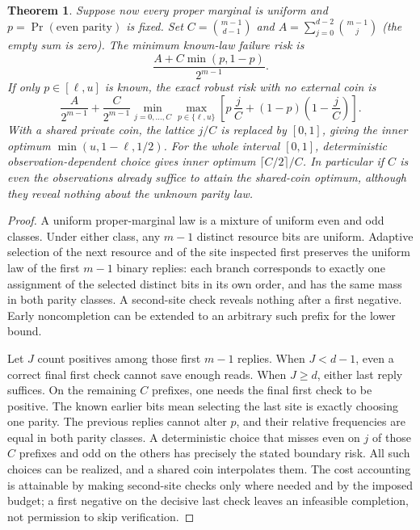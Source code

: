 \documentclass[11pt]{article}
\newtheorem{theorem}{Theorem}
\begin{document}
\begin{theorem}
Suppose now every proper marginal is uniform and $p=\Pr(\text{even parity})$ is fixed. Set $C=\binom{m-1}{d-1}$ and $A=\sum_{j=0}^{d-2}\binom{m-1}{j}$ (the empty sum is zero). The minimum known-law failure risk is
\[
 \frac{A+C\min(p,1-p)}{2^{m-1}} .
\]
If only $p\in[\ell,u]$ is known, the exact robust risk with no external coin is
\[
 \frac{A}{2^{m-1}}+
 \frac{C}{2^{m-1}}
 \min_{j=0,\ldots,C}\max_{p\in\{\ell,u\}}
 \left[p\,\frac{j}{C}+(1-p)(1-\frac{j}{C})\right].
\]
With a shared private coin, the lattice $j/C$ is replaced by $[0,1]$, giving the inner optimum $\min(u,1-\ell,1/2)$. For the whole interval $[0,1]$, deterministic observation-dependent choice gives inner optimum $\lceil C/2\rceil/C$. In particular if $C$ is even the observations already suffice to attain the shared-coin optimum, although they reveal nothing about the unknown parity law.
\end{theorem}

\begin{proof}
A uniform proper-marginal law is a mixture of uniform even and odd classes. Under either class, any $m-1$ distinct resource bits are uniform. Adaptive selection of the next resource and of the site inspected first preserves the uniform law of the first $m-1$ binary replies: each branch corresponds to exactly one assignment of the selected distinct bits in its own order, and has the same mass in both parity classes. A second-site check reveals nothing after a first negative. Early noncompletion can be extended to an arbitrary such prefix for the lower bound.

Let $J$ count positives among those first $m-1$ replies. When $J<d-1$, even a correct final first check cannot save enough reads. When $J\ge d$, either last reply suffices. On the remaining $C$ prefixes, one needs the final first check to be positive. The known earlier bits mean selecting the last site is exactly choosing one parity. The previous replies cannot alter $p$, and their relative frequencies are equal in both parity classes. A deterministic choice that misses even on $j$ of those $C$ prefixes and odd on the others has precisely the stated boundary risk. All such choices can be realized, and a shared coin interpolates them. The cost accounting is attainable by making second-site checks only where needed and by the imposed budget; a first negative on the decisive last check leaves an infeasible completion, not permission to skip verification.
\end{proof}
\end{document}
